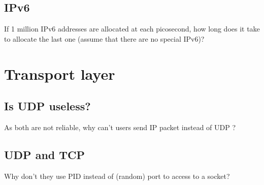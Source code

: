 \documentclass[11pt]{article}
\begin{document}
\subsection{IPv6}
If 1 million IPv6 addresses are allocated at each picosecond, how long does it take to allocate the last one (assume that there are no special IPv6)? %

\section{Transport layer}
\subsection{Is UDP useless?}
As both are not reliable, why can't users send IP packet instead of UDP ?

\subsection{UDP and TCP}
Why don't they use PID instead of (random) port to access to a socket?
\end{document}
